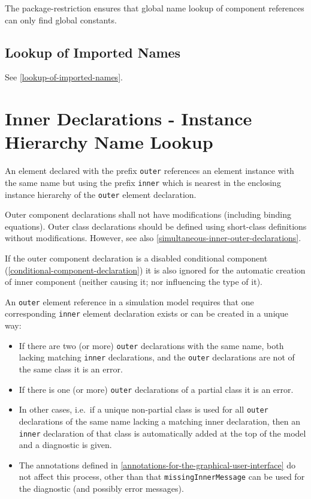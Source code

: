 \begin{nonnormative}
The package-restriction ensures that global name lookup of component references can only find global constants.
\end{nonnormative}


\subsection{Lookup of Imported Names}\label{lookup-of-imported-names1}

See \cref{lookup-of-imported-names}.


\section{Inner Declarations - Instance Hierarchy Name Lookup}\label{instance-hierarchy-name-lookup-of-inner-declarations}\label{inner-declarations-instance-hierarchy-name-lookup}

An element declared with the prefix \lstinline!outer! references an element instance with the same name but using the prefix \lstinline!inner! which is nearest in the enclosing instance hierarchy of the \lstinline!outer! element declaration.

Outer component declarations shall not have modifications (including binding equations).
Outer class declarations should be defined using short-class definitions without modifications.
However, see also \cref{simultaneous-inner-outer-declarations}.

If the outer component declaration is a disabled conditional component (\cref{conditional-component-declaration}) it is also ignored for the automatic creation of inner component (neither causing it; nor influencing the type of it).

An \lstinline!outer! element reference in a simulation model requires that one corresponding \lstinline!inner! element declaration exists or can be created in a unique way:
\begin{itemize}
\item
  If there are two (or more) \lstinline!outer! declarations with the same name, both lacking matching \lstinline!inner! declarations, and the \lstinline!outer! declarations are not of the same class it is an error.
\item
  If there is one (or more) \lstinline!outer! declarations of a partial class it is an error.
\item
  In other cases, i.e.\ if a unique non-partial class is used for all \lstinline!outer! declarations of the same name lacking a matching inner declaration, then an \lstinline!inner! declaration of that class is automatically added at the top of the model and a diagnostic is given.
\item
  The annotations defined in \cref{annotations-for-the-graphical-user-interface} do not affect this process, other than that \lstinline!missingInnerMessage! can be used for the diagnostic (and possibly error messages).
\end{itemize}

